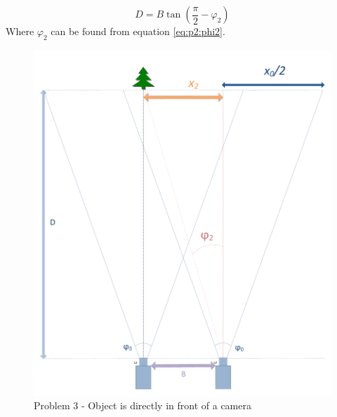 \begin{equation} \label{eq:p3:D}
D = B \tan\left(\frac{\pi}{2} - \varphi_{2}\right)
\end{equation}
Where $\varphi_2$ can be found from equation \ref{eq:p2:phi2}. 
\begin{figure}
\includegraphics[width=\textwidth,height=\textheight,keepaspectratio]{Figures/problem3.pdf}
\caption{Problem 3 - Object is directly in front of a camera}
\label{fig:problem_infront}
\end{figure}